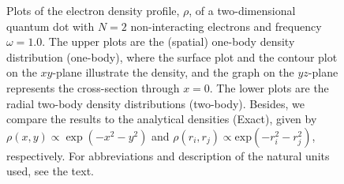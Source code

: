 \begin{figure}
	\hspace{0.1cm}
	
	\caption{Plots of the electron density profile, $\rho$, of a two-dimensional quantum dot with $N=2$ non-interacting electrons and frequency $\omega=1.0$. The upper plots are the (spatial) one-body density distribution (one-body), where the surface plot and the contour plot on the $xy$-plane illustrate the density, and the graph on the $yz$-plane represents the cross-section through $x=0$. The lower plots are the radial two-body density distributions (two-body). Besides, we compare the results to the analytical densities (Exact), given by $\rho(x,y)\propto\exp(-x^2-y^2)$ and $\rho(r_i,r_j)\propto\text{exp}(-r_i^2-r_j^2)$, respectively. For  abbreviations and description of the natural units used, see the text.}
	\label{fig:ED_nointeraction}
\end{figure}

